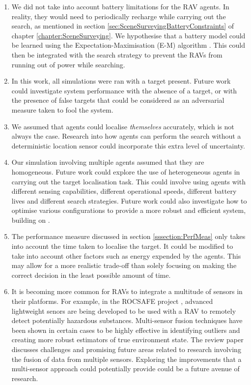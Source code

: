 \begin{enumerate}

    \item We did not take into account battery limitations for the RAV agents. In reality, they would need to periodically recharge while carrying out the search, as mentioned in section \ref{sec:SceneSurveyingBatteryConstraints} of chapter \ref{chapter:SceneSurveying}. We hypothesise that a battery model could be learned using the Expectation-Maximisation (E-M) algorithm \cite{Dempster1977MaximumAlgorithm}. This could then be integrated with the search strategy to prevent the RAVs from running out of power while searching.
    \item In this work, all simulations were ran with a target present. Future work could investigate system performance with the absence of a target, or with the presence of false targets that could be considered as an adversarial measure taken to fool the system.
    \item We assumed that agents could localise \textit{themselves} accurately, which is not always the case. Research into how agents can perform the search without a deterministic location sensor could incorporate this extra level of uncertainty.
    \item Our simulation involving multiple agents assumed that they are homogeneous. Future work could explore the use of heterogeneous agents in carrying out the target localisation task. This could involve using agents with different sensing capabilities, different operational speeds, different battery lives and different search strategies. Future work could also investigate how to optimise various configurations to provide a more robust and efficient system, building on \cite{Chung2008Multi-agentFramework}.
    \item The performance measure discussed in section \ref{sssection:PerfMeas} only takes into account the time taken to localise the target. It could be modified to take into account other factors such as energy expended by the agents. This may allow for a more realistic trade-off than solely focusing on making the correct decision in the least possible amount of time.
    \item It is becoming more common for RAVs to integrate a multitude of sensors in their platforms. For example, in the ROCSAFE project \cite{Bagherzadeh2017ROCSAFE:Incidents}, advanced lightweight senors are being developed to be used with a RAV to remotely detect potentially hazardous substances. Multi-sensor fusion techniques have been shown in certain cases to be highly effective in identifying outliers and creating more robust estimators of true environment state. The review paper \cite{Khaleghi2013MultisensorState-of-the-art} discusses challenges and promising future areas related to research involving the fusion of data from multiple sensors. Exploring the improvements that a multi-sensor approach could potentially provide could be a future avenue of research.

\end{enumerate}
